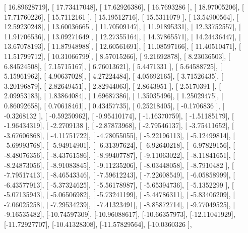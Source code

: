 \documentclass{article}
\begin{document}
       [ 16.89628719],
       [ 17.73417048],
       [ 17.62926386],
       [ 16.7693286 ],
       [ 18.97005206],
       [ 17.71760226],
       [ 15.7112161 ],
       [ 15.19512716],
       [ 15.5311079 ],
       [ 13.54900564],
       [ 12.59230248],
       [ 13.60036665],
       [ 11.70509147],
       [ 11.91895331],
       [ 12.33752557],
       [ 11.91706536],
       [ 13.09271649],
       [ 12.27355164],
       [ 14.37865571],
       [ 14.24436447],
       [ 13.67078193],
       [ 11.87948988],
       [ 12.60561691],
       [ 11.08597166],
       [ 11.40510471],
       [ 11.51799712],
       [ 10.31066799],
       [  8.57015266],
       [  9.21692878],
       [  8.23036503],
       [  6.84524508],
       [  7.15715167],
       [  6.76013621],
       [  5.4471331 ],
       [  5.64588725],
       [  5.15961962],
       [  4.90637028],
       [  4.27224484],
       [  4.05692165],
       [  3.71526435],
       [  3.20196879],
       [  2.82649451],
       [  2.82944063],
       [  2.8643951 ],
       [  2.5170391 ],
       [  2.09953183],
       [  1.83864084],
       [  1.69687386],
       [  1.35035496],
       [  1.25029475],
       [  0.86092658],
       [  0.70618461],
       [  0.43457735],
       [  0.25218405],
       [ -0.1706836 ],
       [ -0.3268132 ],
       [ -0.59250962],
       [ -0.95410174],
       [ -1.16370759],
       [ -1.51185179],
       [ -1.96434319],
       [ -2.2709138 ],
       [ -2.87873968],
       [ -2.79546137],
       [ -3.75411652],
       [ -3.67606868],
       [ -4.11751722],
       [ -4.78055055],
       [ -5.22196113],
       [ -5.12499814],
       [ -5.69993768],
       [ -5.94914901],
       [ -6.31397624],
       [ -6.92640218],
       [ -6.97829156],
       [ -8.48076356],
       [ -8.43761586],
       [ -8.99407787],
       [ -9.11063022],
       [ -8.11841651],
       [ -8.24873056],
       [ -8.91083845],
       [ -9.11235206],
       [ -8.03448058],
       [ -8.7910482 ],
       [ -7.79517413],
       [ -8.46543346],
       [ -7.59612243],
       [ -7.22608549],
       [ -6.05858999],
       [ -6.43577913],
       [ -5.37324625],
       [ -5.56178987],
       [ -5.65394736],
       [ -5.1352299 ],
       [ -5.07135943],
       [ -5.06506982],
       [ -5.73241199],
       [ -5.44786311],
       [ -5.83406209],
       [ -7.06025258],
       [ -7.29534239],
       [ -7.41323491],
       [ -8.85872714],
       [ -9.77049525],
       [ -9.16535482],
       [-10.74597309],
       [-10.96088617],
       [-10.66357973],
       [-12.11041929],
       [-11.72927707],
       [-10.41328308],
       [-11.57829564],
       [-10.0360326 ],
\end{document}

